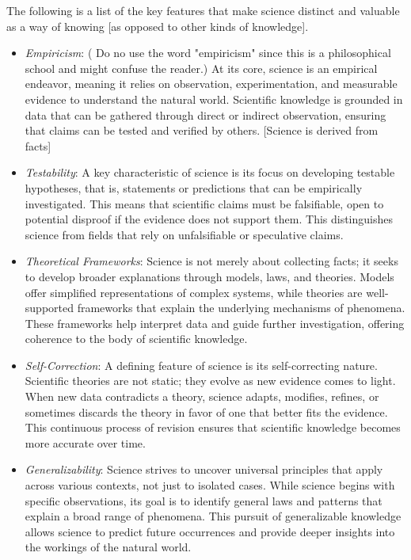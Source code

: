 The following is a list of the key features that make science distinct and valuable as a way of knowing {\color{red} [as opposed to other kinds of knowledge]}.

\begin{itemize}

\item \emph{Empiricism}: {(\color{red} Do no use the word "empiricism" since this is a philosophical school and might confuse the reader.)} At its core, science is an empirical endeavor, meaning it relies on observation, experimentation, and measurable evidence to understand the natural world. Scientific knowledge is grounded in data that can be gathered through direct or indirect observation, ensuring that claims can be tested and verified by others. {\color{red} [Science is derived from facts]}

\item \emph{Testability}: A key characteristic of science is its focus on developing testable hypotheses, that is, statements or predictions that can be empirically investigated. This means that scientific claims must be falsifiable, open to potential disproof if the evidence does not support them. This distinguishes science from fields that rely on unfalsifiable or speculative claims.

\item \emph{Theoretical Frameworks}: Science is not merely about collecting facts; it seeks to develop broader explanations through models, laws, and theories. Models offer simplified representations of complex systems, while theories are well-supported frameworks that explain the underlying mechanisms of phenomena. These frameworks help interpret data and guide further investigation, offering coherence to the body of scientific knowledge.

\item \emph{Self-Correction}: A defining feature of science is its self-correcting nature. Scientific theories are not static; they evolve as new evidence comes to light. When new data contradicts a theory, science adapts, modifies, refines, or sometimes discards the theory in favor of one that better fits the evidence. This continuous process of revision ensures that scientific knowledge becomes more accurate over time.

\item \emph{Generalizability}: Science strives to uncover universal principles that apply across various contexts, not just to isolated cases. While science begins with specific observations, its goal is to identify general laws and patterns that explain a broad range of phenomena. This pursuit of generalizable knowledge allows science to predict future occurrences and provide deeper insights into the workings of the natural world.

\end{itemize}

